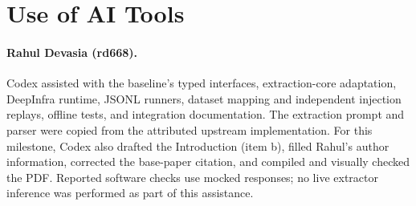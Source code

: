 \section{Use of AI Tools}
\label{sec:ai}


\paragraph{Rahul Devasia (rd668).}
Codex assisted with the baseline's typed interfaces, extraction-core adaptation,
DeepInfra runtime, JSONL runners, dataset mapping and independent injection
replays, offline tests, and integration documentation. The extraction prompt
and parser were copied from the attributed upstream implementation. For this
milestone, Codex also drafted the Introduction (item b), filled Rahul's author
information, corrected the base-paper citation, and compiled and visually
checked the PDF. Reported software checks use mocked responses; no live
extractor inference was performed as part of this assistance.
